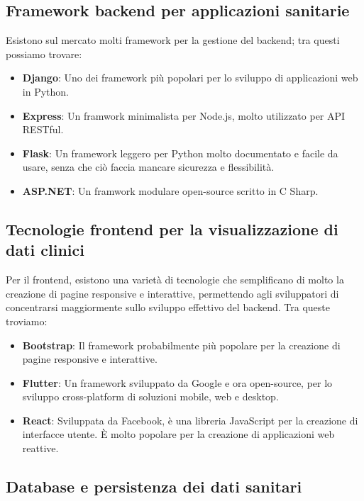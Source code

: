 \documentclass[12pt,a4paper,oneside]{report}
\begin{document}
\subsection{Framework backend per applicazioni sanitarie}
Esistono sul mercato molti framework per la gestione del backend; tra questi possiamo trovare\cite{geeksforgeeks}:

\begin{itemize}
    \item \textbf{Django}: Uno dei framework più popolari per lo sviluppo di applicazioni web in Python.
    \item \textbf{Express}: Un framwork minimalista per Node.js, molto utilizzato per API RESTful.
    \item \textbf{Flask}: Un framework leggero per Python molto documentato e facile da usare, senza che ciò faccia mancare sicurezza e flessibilità.
    \item \textbf{ASP.NET}: Un framwork modulare open-source scritto in C Sharp.
\end{itemize}

\subsection{Tecnologie frontend per la visualizzazione di dati clinici}
Per il frontend, esistono una varietà di tecnologie che semplificano di molto la creazione di pagine responsive e interattive, permettendo agli sviluppatori di concentrarsi maggiormente sullo sviluppo effettivo del backend. Tra queste troviamo:

\begin{itemize}
    \item \textbf{Bootstrap}: Il framework probabilmente più popolare per la creazione di pagine responsive e interattive. \cite{bootstrap}
    \item \textbf{Flutter}: Un framework sviluppato da Google e ora open-source, per lo sviluppo cross-platform di soluzioni mobile, web e desktop. \cite{flutter}
    \item \textbf{React}: Sviluppata da Facebook, è una libreria JavaScript per la creazione di interfacce utente. È molto popolare per la creazione di applicazioni web reattive. \cite{react}
\end{itemize}

\subsection{Database e persistenza dei dati sanitari}
\end{document}
